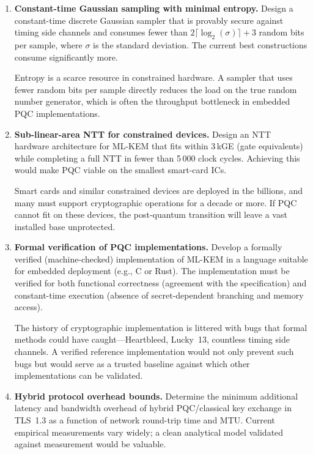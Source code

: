 \begin{enumerate}
Theoretical leakage bounds would transform side-channel protection from an empirical art into an engineering discipline, allowing designers to choose masking orders with provable security guarantees rather than relying on attack-and-patch cycles.

\item \textbf{Constant-time Gaussian sampling with minimal entropy.}
Design a constant-time discrete Gaussian sampler that is provably secure against timing side channels and consumes fewer than $2\lceil\log_2(\sigma)\rceil + 3$ random bits per sample, where $\sigma$ is the standard deviation.  The current best constructions consume significantly more.

Entropy is a scarce resource in constrained hardware.  A sampler that uses fewer random bits per sample directly reduces the load on the true random number generator, which is often the throughput bottleneck in embedded PQC implementations.

\item \textbf{Sub-linear-area NTT for constrained devices.}
Design an NTT hardware architecture for ML-KEM that fits within 3\,kGE (gate equivalents) while completing a full NTT in fewer than 5\,000 clock cycles.  Achieving this would make PQC viable on the smallest smart-card ICs.

Smart cards and similar constrained devices are deployed in the billions, and many must support cryptographic operations for a decade or more.  If PQC cannot fit on these devices, the post-quantum transition will leave a vast installed base unprotected.

\item \textbf{Formal verification of PQC implementations.}
Develop a formally verified (machine-checked) implementation of ML-KEM in a language suitable for embedded deployment (e.g., C or Rust).  The implementation must be verified for both functional correctness (agreement with the specification) and constant-time execution (absence of secret-dependent branching and memory access).

The history of cryptographic implementation is littered with bugs that formal methods could have caught---Heartbleed, Lucky~13, countless timing side channels.  A verified reference implementation would not only prevent such bugs but would serve as a trusted baseline against which other implementations can be validated.

\item \textbf{Hybrid protocol overhead bounds.}
Determine the minimum additional latency and bandwidth overhead of hybrid PQC/classical key exchange in TLS~1.3 as a function of network round-trip time and MTU.  Current empirical measurements vary widely; a clean analytical model validated against measurement would be valuable.


\end{enumerate}
